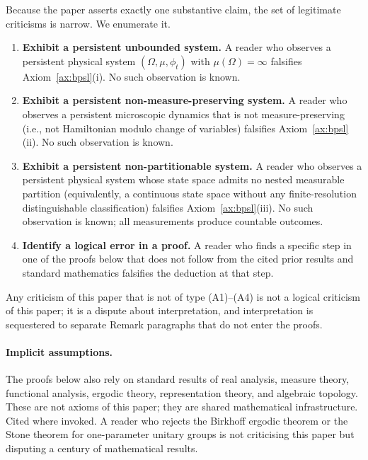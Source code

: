 \documentclass[11pt,twocolumn,a4paper]{article}
\theoremstyle{axiomstyle}
\theoremstyle{conseqstyle}
\theoremstyle{definition}
\theoremstyle{remark}
\begin{document}
Because the paper asserts exactly one substantive claim, the set of legitimate criticisms is narrow. We enumerate it.

\begin{enumerate}[label=(A\arabic*)]
  \item\label{at:unbounded} \textbf{Exhibit a persistent unbounded system.} A reader who observes a persistent physical system $(\Omega,\mu,\phi_{t})$ with $\mu(\Omega)=\infty$ falsifies Axiom~\ref{ax:bpsl}(i). No such observation is known.
  \item\label{at:nonliouville} \textbf{Exhibit a persistent non-measure-preserving system.} A reader who observes a persistent microscopic dynamics that is not measure-preserving (i.e., not Hamiltonian modulo change of variables) falsifies Axiom~\ref{ax:bpsl}(ii). No such observation is known.
  \item\label{at:nonpartition} \textbf{Exhibit a persistent non-partitionable system.} A reader who observes a persistent physical system whose state space admits no nested measurable partition (equivalently, a continuous state space without any finite-resolution distinguishable classification) falsifies Axiom~\ref{ax:bpsl}(iii). No such observation is known; all measurements produce countable outcomes.
  \item\label{at:proof} \textbf{Identify a logical error in a proof.} A reader who finds a specific step in one of the proofs below that does not follow from the cited prior results and standard mathematics falsifies the deduction at that step.
\end{enumerate}

Any criticism of this paper that is not of type (A1)--(A4) is not a logical criticism of this paper; it is a dispute about interpretation, and interpretation is sequestered to separate Remark paragraphs that do not enter the proofs.

\paragraph{Implicit assumptions.} The proofs below also rely on standard results of real analysis, measure theory, functional analysis, ergodic theory, representation theory, and algebraic topology. These are not axioms of this paper; they are shared mathematical infrastructure. Cited where invoked. A reader who rejects the Birkhoff ergodic theorem or the Stone theorem for one-parameter unitary groups is not criticising this paper but disputing a century of mathematical results.
\end{document}
